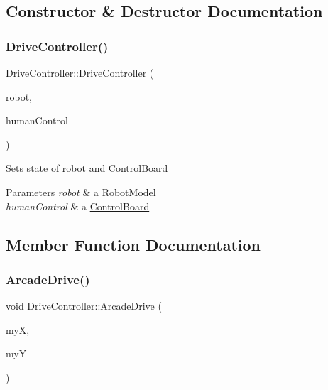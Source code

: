\subsection{Constructor \& Destructor Documentation}
\mbox{\label{class_drive_controller_a166bb5ed50199d8482ebbc0e244742a1}} 
\subsubsection{\texorpdfstring{Drive\+Controller()}{DriveController()}}
{\footnotesize\ttfamily Drive\+Controller\+::\+Drive\+Controller (\begin{DoxyParamCaption}\item[{\hyperlink{class_robot_model}{Robot\+Model} $\ast$}]{robot,  }\item[{\hyperlink{class_control_board}{Control\+Board} $\ast$}]{human\+Control }\end{DoxyParamCaption})}

Sets state of robot and \hyperlink{class_control_board}{Control\+Board} 
\begin{DoxyParams}{Parameters}
{\em robot} & a \hyperlink{class_robot_model}{Robot\+Model} \\
\hline
{\em human\+Control} & a \hyperlink{class_control_board}{Control\+Board} \\
\hline
\end{DoxyParams}


\subsection{Member Function Documentation}
\mbox{\label{class_drive_controller_a59d4b701fd83e101a3aaf9726fc626dd}} 
\subsubsection{\texorpdfstring{Arcade\+Drive()}{ArcadeDrive()}}
{\footnotesize\ttfamily void Drive\+Controller\+::\+Arcade\+Drive (\begin{DoxyParamCaption}\item[{double}]{myX,  }\item[{double}]{myY }\end{DoxyParamCaption})\hspace{0.3cm}{\ttfamily [private]}}

